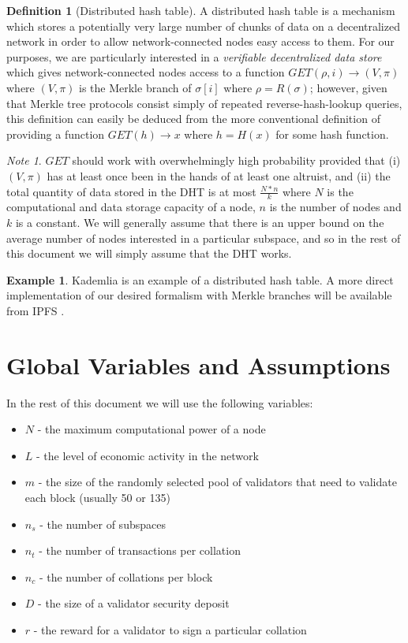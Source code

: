 \documentclass[11pt,a4paper]{article}
\theoremstyle{plain}
\theoremstyle{definition}
\newtheorem{defn}{Definition}[section]
\newtheorem{exmp}{Example}[section]
\theoremstyle{remark}
\newtheorem*{note}{Note}
\begin{document}
\begin{defn}[Distributed hash table]
A distributed hash table is a mechanism which stores a potentially very large number of chunks of data on a decentralized network in order to allow network-connected nodes easy access to them. For our purposes, we are particularly interested in a \emph{verifiable decentralized data store} which gives network-connected nodes access to a function $GET(\rho, i) \rightarrow (V, \pi)$ where $(V, \pi)$ is the Merkle branch of $\sigma[i]$ where $\rho = R(\sigma)$; however, given that Merkle tree protocols consist simply of repeated reverse-hash-lookup queries, this definition can easily be deduced from the more conventional definition of providing a function $GET(h) \rightarrow x$ where $h = H(x)$ for some hash function.
\end{defn}

\begin{note}
$GET$ should work with overwhelmingly high probability provided that (i) $(V, \pi)$ has at least once been in the hands of at least one altruist, and (ii) the total quantity of data stored in the DHT is at most $\frac{N * n}{k}$ where $N$ is the computational and data storage capacity of a node, $n$ is the number of nodes and $k$ is a constant. We will generally assume that there is an upper bound on the average number of nodes interested in a particular subspace, and so in the rest of this document we will simply assume that the DHT works.
\end{note}

\begin{exmp}
Kademlia \cite{kademlia} is an example of a distributed hash table. A more direct implementation of our desired formalism with Merkle branches will be available from IPFS \cite{ipfs}.
\end{exmp}

\section{Global Variables and Assumptions}

In the rest of this document we will use the following variables:

\begin{itemize}
\item
$N$ - the maximum computational power of a node
\item
$L$ - the level of economic activity in the network
\item
$m$ - the size of the randomly selected pool of validators that need to validate each block (usually 50 or 135)
\item
$n_s$ - the number of subspaces
\item
$n_t$ - the number of transactions per collation
\item
$n_c$ - the number of collations per block
\item
$D$ - the size of a validator security deposit
\item
$r$ - the reward for a validator to sign a particular collation
\end{itemize}
\end{document}
